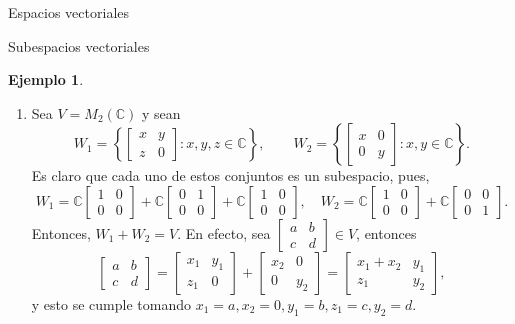 \documentclass[a4paper,12pt,twoside,spanish]{amsbook}
\theoremstyle{definition}
\newtheorem{ejemplo}{Ejemplo}[section]
\theoremstyle{remark}
\newcommand{\C}{\mathbb C}
\begin{document}
\begin{chapter}{Espacios vectoriales}
\begin{section}{Subespacios vectoriales}
\begin{ejemplo}
\begin{enumerate}
			\item Sea $V = M_2(\C)$ y sean 
			\begin{equation*}
				W_1 = \left\{\begin{bmatrix} x&y\\z&0 \end{bmatrix}: x,y,z \in \C \right\}, 
				\qquad W_2 = \left\{\begin{bmatrix} x&0\\0&y \end{bmatrix}: x,y \in \C \right\}.
			\end{equation*} 
			Es claro que cada uno de estos conjuntos es un subespacio, pues,
			$$
			W_1 = \C \begin{bmatrix} 1&0\\0&0 \end{bmatrix} +
			\C \begin{bmatrix} 0&1\\0&0 \end{bmatrix} +
			\C \begin{bmatrix} 1&0\\0&0 \end{bmatrix}, \quad 
			W_2 = \C \begin{bmatrix} 1&0\\0&0 \end{bmatrix} +
			\C \begin{bmatrix} 0&0\\0&1 \end{bmatrix}. 
			$$
			Entonces, $W_1 + W_2 = V$. En  efecto, sea 
			$\begin{bmatrix} a&b\\c&d\end{bmatrix} \in V$, entonces
			$$
			\begin{bmatrix} a&b\\c&d\end{bmatrix} =  \begin{bmatrix} x_1&y_1\\z_1&0 \end{bmatrix} + 
			\begin{bmatrix} x_2&0\\0&y_2 \end{bmatrix} =
			\begin{bmatrix} x_1+x_2&y_1\\z_1&y_2 \end{bmatrix},
			$$
			y esto se cumple  tomando $x_1 = a, x_2 =0,  y_1 = b, z_1= c, y_2 =d$.
			

\end{enumerate}
\end{ejemplo}
\end{section}
\end{chapter}
\end{document}
